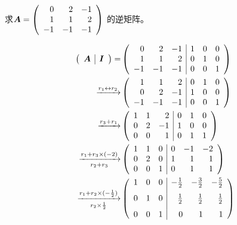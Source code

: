 \begin{li}
  求$
  \boldsymbol{A}=\left(
    \begin{array}{rrr}
      0&2&-1\\
      1&1&2\\
      -1&-1&-1
    \end{array}
  \right)
  $
  的逆矩阵。
\end{li}
\begin{jie}

$$
\begin{aligned}
\left(
  \begin{array}{c|c}
    \boldsymbol{A} & \boldsymbol{I}
  \end{array}
\right)=&\left(
  \begin{array}{rrr|rrr}
    0 &  2 & -1 &  1 & 0 & 0\\
    1 &  1 &  2 &  0 & 1 & 0\\
    -1 & -1 & -1 &  0 & 0 & 1\\              
  \end{array}
\right)\\
\xrightarrow[]{r_1\leftrightarrow r_2}&\left(
  \begin{array}{rrr|rrr}
    1 &  1 &  2 &  0 & 1 & 0\\
    0 &  2 & -1 &  1 & 0 & 0\\
    -1 & -1 & -1 &  0 & 0 & 1\\          
  \end{array}
\right)\\
\xrightarrow[]{r_3+ r_1}&\left(
  \begin{array}{rrr|rrr}
    1 &  1 &  2 & 0 & 1 & 0\\
    0 &  2 & -1 & 1 & 0 & 0\\
    0 &  0 &  1 & 0 & 1 & 1\\          
  \end{array}
\right)\\
\xrightarrow[r_2+r_3]{r_1+ r_3\times(-2)}&\left(
  \begin{array}{rrr|rrr}
    1 &  1 &  0  & 0 &-1 &-2\\
    0 &  2 &  0  & 1 & 1 & 1\\
    0 &  0 &  1  & 0 & 1 & 1\\    
  \end{array}
\right)\\
\xrightarrow[r_2\times \frac12]{r_1+ r_2\times(-\frac12)}&\left(
  \begin{array}{rrr|rrr}
    1 &  0 &  0  & -\frac12 &-\frac32 &-\frac52\\[.1in]
    0 &  1 &  0  & \frac12 & \frac12 & \frac12 \\[.1in]
    0 &  0 &  1  & 0 & 1 & 1                   
  \end{array}
\right)    
\end{aligned}
$$
\end{jie}

